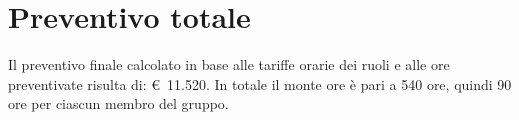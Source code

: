 \section{Preventivo totale}

Il preventivo finale calcolato in base alle tariffe orarie dei ruoli e alle ore preventivate risulta di: \euro~11.520.
In totale il monte ore è pari a 540 ore, quindi 90 ore per ciascun membro del gruppo.
